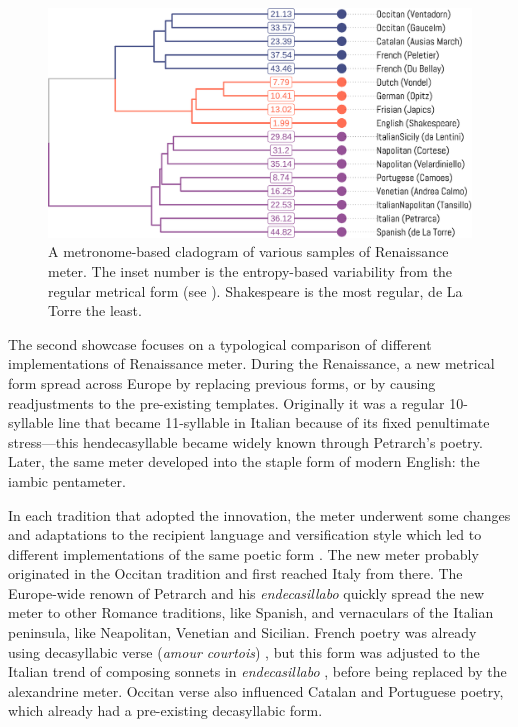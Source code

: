 \documentclass[
    hf
]{ceurart}
\begin{document}
\begin{figure}
    \includegraphics[width=\linewidth]{figures/ren_dendro-crop.pdf}
    \caption{A metronome-based cladogram of various samples of Renaissance meter. The inset number is the entropy-based variability from the regular metrical form (see \cite{sela_measuring_2022}). Shakespeare is the most regular, de La Torre the least.}
    \label{fig:ren_dendro}
\end{figure}

The second showcase focuses on a typological comparison of different implementations of Renaissance meter. During the Renaissance, a new metrical form  spread across Europe by replacing previous forms, or by causing readjustments to the pre-existing templates. Originally it was a regular 10-syllable line that became 11-syllable in Italian because of its fixed penultimate stress---this hendecasyllable became widely known through Petrarch's poetry. Later, the same meter developed into the staple form of modern English: the iambic pentameter.

In each tradition that adopted the innovation, the meter underwent some changes and adaptations to the recipient language and versification style which led to different implementations of the same poetic form \cite{de_sisto_interaction_2020}. The new meter probably originated in the Occitan tradition \cite{beltrami_cesura_1986, di_girolamo_i_1999, billy_linvention_2000} and first reached Italy from there. The Europe-wide renown of Petrarch and his \textit{endecasillabo} quickly spread the new meter to other Romance traditions, like Spanish, and vernaculars of the Italian peninsula, like Neapolitan, Venetian and Sicilian. French poetry was already using decasyllabic verse (\textit{amour courtois}) \cite{hudson_short_1919}, but this form was adjusted to the Italian trend of composing sonnets in \textit{endecasillabo} \cite{hudson_short_1919,key_short_2006}, before being replaced by the alexandrine meter. Occitan verse also influenced Catalan and Portuguese poetry, which already had a pre-existing decasyllabic form.
\end{document}

